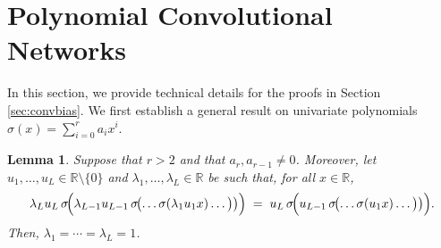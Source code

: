 \documentclass{article} %
\theoremstyle{plain}%
\newtheorem{lemm}[thm]{Lemma}
\theoremstyle{definition}
\theoremstyle{remark}
\begin{document}
\section{Polynomial Convolutional Networks}\label{sec:appcnn}
In this section, we provide technical details for the proofs in Section \ref{sec:convbias}. We first establish a general result on univariate polynomials $\sigma(x) = \sum_{i=0}^r a_i x^i$. 
\begin{lemm}\label{lem:rigidity}
Suppose that $r > 2$ and that $a_r, a_{r-1} \not = 0$. 
Moreover, let $u_1, \ldots, u_L \in \mathbb{R}\setminus\lbrace 0 \rbrace$ and $\lambda_{1},\dots,\lambda_{L} \in \mathbb{R}$ be such that, for all $x \in \mathbb{R}$,
\begin{equation}\label{eq:main-L}
   \lambda_{L} u_L\,
   \sigma\!\Bigl(
        \lambda_{L-1} u_{L-1}\,
        \sigma\!\bigl(
             \dots \sigma(\lambda_{1}u_1x)\dots\bigr)\bigr)
      \Bigr)
   \;=\;
   u_L\,
   \sigma\!\Bigl(
         u_{L-1}\,
        \sigma\!\bigl(
             \dots \sigma(u_1x)\dots\bigr)\bigr)
      \Bigr).
\end{equation}
Then, $\lambda_1=\cdots=\lambda_L=1$.
\end{lemm}
\end{document}
